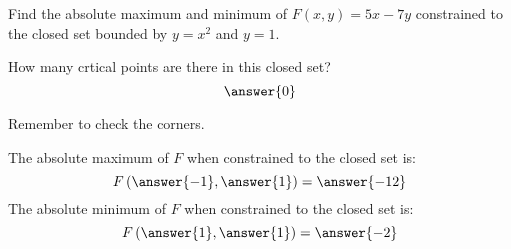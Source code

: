 \documentclass{ximera}
\author{Gregory Hartman \and Bart Snapp}
\begin{document}
\begin{exercise}
  Find the absolute maximum and minimum of $F(x,y) = 5x-7y$ constrained to the closed set bounded by $y=x^2$ and $y=1$.
  
  \begin{prompt}
    How many crtical points are there in this closed set?
    \[
    \answer{0}
    \]
    \begin{exercise}
    \begin{hint}
      Remember to check the corners.
    \end{hint}
    The absolute maximum of $F$ when constrained to the closed set is:
    \[
    F\left(\answer{-1},\answer{1}\right) = \answer{-12}
    \]
    The absolute minimum of $F$ when constrained to the closed set is:
    \[
    F\left(\answer{1},\answer{1}\right) = \answer{-2}
    \]
  \end{exercise}
  \end{prompt}
\end{exercise}
\end{document}
